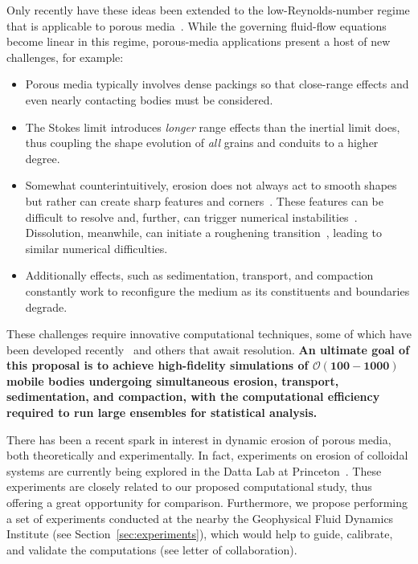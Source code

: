 \documentclass[11pt]{article}
\begin{document}
Only recently have these ideas been extended to the low-Reynolds-number regime that is applicable to porous media~\cite{mitchell2017generalized, Quaife2018}. While the governing fluid-flow equations become linear in this regime, porous-media applications present a host of new challenges, for example:
\begin{itemize}[noitemsep]
\item Porous media typically involves dense packings so that close-range effects and even nearly contacting bodies must be considered.

\item The Stokes limit introduces {\em longer} range effects than the inertial limit does, thus coupling the shape evolution of {\em all} grains and conduits to a higher degree.

\item Somewhat counterintuitively, erosion does not always act to smooth shapes but rather can create sharp features and corners~\cite{Ristroph2012}. These features can be difficult to resolve and, further, can trigger numerical instabilities~\cite{Quaife2018}. Dissolution, meanwhile, can initiate a roughening transition~\cite{claudin2017dissolution}, leading to similar numerical difficulties.

\item Additionally effects, such as sedimentation, transport, and compaction constantly work to reconfigure the medium as its constituents and boundaries degrade.
\end{itemize}
These challenges require innovative computational techniques, some of which have been developed recently~\cite{Quaife2018} and others that await resolution. {\bf An ultimate goal of this proposal is to achieve high-fidelity simulations of $\boldsymbol{\mathcal{O}(100-1000)}$ mobile bodies undergoing simultaneous erosion, transport, sedimentation, and compaction, with the computational efficiency required to run large ensembles for statistical analysis.} 

	There has been a recent spark in interest in dynamic erosion of porous media, both theoretically and experimentally. In fact, experiments on erosion of colloidal systems are currently being explored in the Datta Lab at Princeton~\cite{bizmark2019multiscale}. These experiments are closely related to our proposed computational study, thus offering a great opportunity for comparison. Furthermore, we propose performing a set of experiments conducted at the nearby the Geophysical Fluid Dynamics Institute (see Section~\ref{sec:experiments}), which would help to guide, calibrate, and validate the computations (see letter of collaboration).
\end{document}
